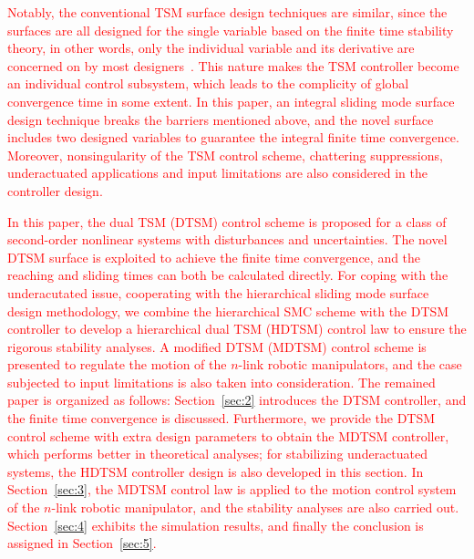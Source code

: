 \documentclass[3p]{elsarticle}
\theoremstyle{plain}
\theoremstyle{remark}
\begin{document}
\textcolor{red}{Notably, the conventional TSM surface design techniques are similar, since the surfaces are all designed for the single variable based on the finite time stability theory, in other words, only the individual variable and its derivative are concerned on by most designers~\cite{mu2016switching}. This nature makes the TSM controller become an individual control subsystem, which leads to the complicity of global convergence time in some extent. In this paper, an integral sliding mode  surface design technique breaks the barriers mentioned above, and the novel surface includes two designed variables to guarantee the integral finite time convergence. Moreover, nonsingularity of the TSM control scheme, chattering suppressions, underactuated applications and input limitations are also considered in the controller design.}

\textcolor{red}{In this paper, the dual TSM (DTSM) control scheme is proposed for a class of second-order nonlinear systems with disturbances and uncertainties. The novel DTSM surface is exploited to achieve the finite time convergence, and the reaching and sliding times can both be calculated directly. For coping with the underacutated issue, cooperating with the hierarchical sliding mode  surface design methodology, we combine the hierarchical SMC scheme with the DTSM controller to develop a hierarchical dual TSM (HDTSM) control law to ensure the rigorous stability analyses. A modified DTSM (MDTSM) control scheme is presented to regulate the motion of the $n$-link robotic manipulators, and the case subjected to input limitations is also taken into consideration. The remained paper is organized as follows: Section~\ref{sec:2} introduces the DTSM controller, and the finite time convergence is discussed. Furthermore, we provide the DTSM control scheme with extra design parameters to obtain the MDTSM controller, which performs better in theoretical analyses; for stabilizing underactuated systems, the HDTSM controller design is also developed in this section. In Section~\ref{sec:3}, the MDTSM control law is applied to the motion control system of the $n$-link robotic  manipulator, and the stability analyses are also carried out. Section~\ref{sec:4} exhibits the simulation results, and finally the conclusion is assigned in Section~\ref{sec:5}.}
\end{document}

